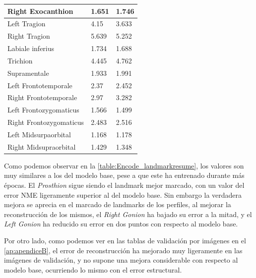 \begin{table}[!ht]
\begin{tabular}{|l|l|l|}
                Right Exocanthion & \cellcolor{green!25}1.651 & 1.746 \\ \hline
                Left Tragion & 4.15 & \cellcolor{green!25}3.633 \\ \hline
                Right Tragion & 5.639 & \cellcolor{green!25}5.252 \\ \hline
                Labiale inferius & 1.734 & \cellcolor{green!25}1.688 \\ \hline
                Trichion & \cellcolor{green!25}4.445 & 4.762 \\ \hline
                Supramentale & \cellcolor{green!25}1.933 & 1.991 \\ \hline
                Left Frontotemporale & \cellcolor{green!25}2.37 & 2.452 \\ \hline
                Right Frontotemporale & \cellcolor{green!25}2.97 & 3.282 \\ \hline
                Left Frontozygomaticus & 1.566 & \cellcolor{green!25}1.499 \\ \hline
                Right Frontozygomaticus & \cellcolor{green!25}2.483 & 2.516 \\ \hline
                Left Midsurpaorbital & \cellcolor{green!25}1.168 & 1.178 \\ \hline
                Right Midsupraorbital & 1.429 & \cellcolor{green!25}1.348 \\ \hline
            \end{tabular}
            \label{table:Encode_landmarkresume}
        \end{table}

    \noindent Como podemos observar en la \autoref{table:Encode_landmarkresume}, los valores son muy similares a los del modelo base, pese a que este ha entrenado durante más épocas. El \textit{Prosthion} sigue siendo el landmark mejor marcado, con un valor del error NME ligeramente superior al del modelo base. Sin embargo la verdadera mejora se aprecia en el marcado de landmarks de los perfiles, al mejorar la reconstrucción de los mismos, el \textit{Right Gonion} ha bajado su error a la mitad, y el \textit{Left Gonion} ha reducido su error en dos puntos con respecto al modelo base.
    
    \medskip
    
    \noindent Por otro lado, como podemos ver en las tablas de validación por imágenes en el \autoref{ap:apendiceB}, el error de reconstrucción ha mejorado muy ligeramente en las imágenes de validación, y no supone una mejora considerable con respecto al modelo base, ocurriendo lo mismo con el error estructural.

